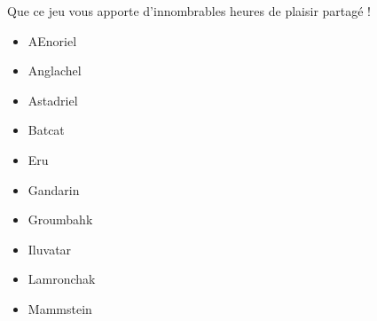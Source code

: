 \begin{titlepage}
{\vspace{0.5cm}
Que ce jeu vous apporte d'innombrables heures de plaisir partagé !

\vspace{0.7cm}
\vspace{0.5cm}

\begin{multicols}{3}
\begin{itemize}
\item \og AEnoriel \fg{}
\item \og Anglachel \fg{}
\item \og Astadriel \fg{}
\item \og Batcat \fg{}
\item \og Eru \fg{}
\item \og Gandarin \fg{}
\item \og Groumbahk \fg{}
\item \og Iluvatar \fg{}
\item \og Lamronchak \fg{}
\item \og Mammstein \fg{}
\end{itemize}
\end{multicols}

\vfill

}


\end{titlepage}